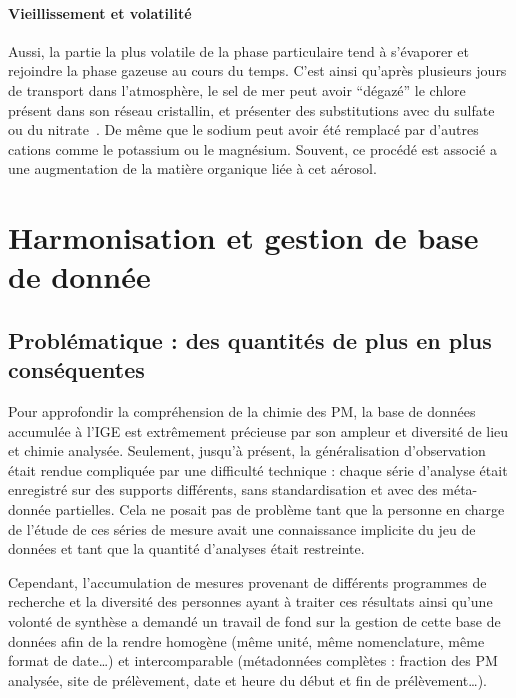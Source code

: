 \paragraph{Vieillissement et volatilité}%
\label{par:vieillissement_et_volatilité}

Aussi, la partie la plus volatile de la phase particulaire tend à s'évaporer et rejoindre
la phase gazeuse au cours du temps. C'est ainsi qu'après plusieurs jours de transport
dans l'atmosphère, le sel de mer peut avoir ``dégazé'' le chlore présent dans son réseau
cristallin, et présenter des substitutions avec du sulfate ou du
nitrate~\parencite{chiSea2015}. De même que le
sodium peut avoir été remplacé par d'autres cations comme le potassium ou le magnésium.
Souvent, ce procédé est associé a une augmentation de la matière organique liée à cet
aérosol.


\section{Harmonisation et gestion de base de donnée}%
\label{sec:harmonisation_et_gestion_de_base_de_donnée}

\subsection{Problématique : des quantités de plus en plus conséquentes}%
\label{sub:problématisation_des_quantités_de_plus_en_plus_conséquentes}

Pour approfondir la compréhension de la chimie des PM, la base de données accumulée à l'IGE
est extrêmement précieuse par son ampleur et diversité de lieu et chimie analysée.
Seulement, jusqu'à présent, la généralisation d'observation était rendue compliquée par une
difficulté technique : chaque série d'analyse était enregistré sur des supports différents,
sans standardisation et avec des méta-donnée partielles. Cela ne posait pas de problème
tant que la personne en charge de l'étude de ces séries de mesure avait une connaissance
implicite du jeu de données et tant que la quantité d'analyses était restreinte.

Cependant, l'accumulation de mesures provenant de différents programmes de recherche et la
diversité des personnes ayant à traiter ces résultats ainsi qu'une volonté de synthèse
a demandé un travail de fond sur la gestion de cette base de données afin de la rendre 
homogène (même unité, même nomenclature, même format de date…) et intercomparable
(métadonnées complètes : fraction des PM analysée, site de prélèvement, date et heure du
début et fin de prélèvement…).

